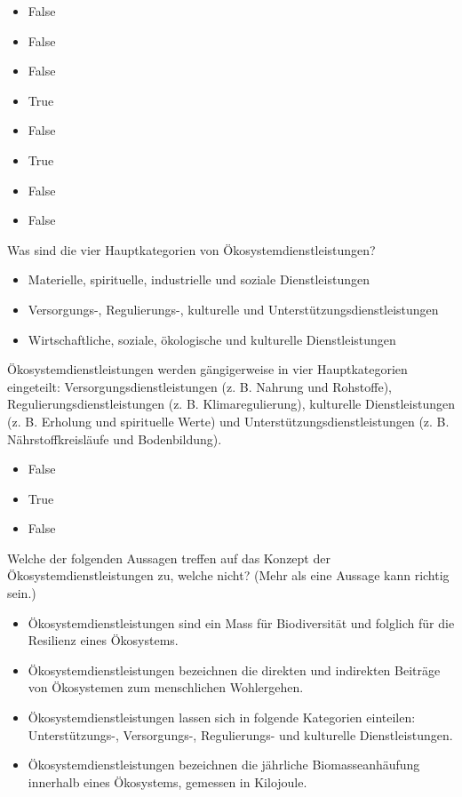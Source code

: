 \documentclass[
  nswissgerman,
  a4paper,
  DIV=11,
  numbers=noendperiod,
  oneside,
  openany]{scrreprt}
\providecommand{\tightlist}{%
  \setlength{\itemsep}{0pt}\setlength{\parskip}{0pt}}
\begin{document}
\begin{itemize}
\tightlist
\item
  False
\item
  False
\item
  False
\item
  True
\item
  False
\item
  True
\item
  False
\item
  False
\end{itemize}

Was sind die vier Hauptkategorien von Ökosystemdienstleistungen?

\begin{itemize}
\tightlist
\item[$\square$]
  Materielle, spirituelle, industrielle und soziale Dienstleistungen
\item[$\square$]
  Versorgungs-, Regulierungs-, kulturelle und
  Unterstützungsdienstleistungen
\item[$\square$]
  Wirtschaftliche, soziale, ökologische und kulturelle Dienstleistungen
\end{itemize}

Ökosystemdienstleistungen werden gängigerweise in vier Hauptkategorien
eingeteilt: Versorgungsdienstleistungen (z. B. Nahrung und Rohstoffe),
Regulierungsdienstleistungen (z. B. Klimaregulierung), kulturelle
Dienstleistungen (z. B. Erholung und spirituelle Werte) und
Unterstützungsdienstleistungen (z. B. Nährstoffkreisläufe und
Bodenbildung).

\begin{itemize}
\tightlist
\item
  False
\item
  True
\item
  False
\end{itemize}

Welche der folgenden Aussagen treffen auf das Konzept der
Ökosystemdienstleistungen zu, welche nicht? (Mehr als eine Aussage kann
richtig sein.)

\begin{itemize}
\tightlist
\item[$\square$]
  Ökosystemdienstleistungen sind ein Mass für Biodiversität und folglich
  für die Resilienz eines Ökosystems.
\item[$\square$]
  Ökosystemdienstleistungen bezeichnen die direkten und indirekten
  Beiträge von Ökosystemen zum menschlichen Wohlergehen.
\item[$\square$]
  Ökosystemdienstleistungen lassen sich in folgende Kategorien
  einteilen: Unterstützungs-, Versorgungs-, Regulierungs- und kulturelle
  Dienstleistungen.
\item[$\square$]
  Ökosystemdienstleistungen bezeichnen die jährliche Biomasseanhäufung
  innerhalb eines Ökosystems, gemessen in Kilojoule.
\end{itemize}
\end{document}
